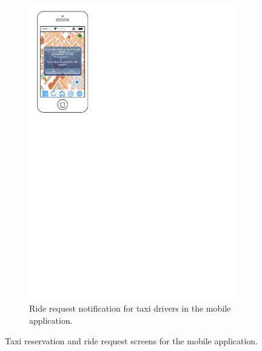 \begin{figure}[h]
\begin{subfigure}{0.45\textwidth}
        \includegraphics[width=\textwidth]{mockup/app/RideRequest}
        \caption{Ride request notification for taxi drivers in the mobile application.}
        \label{fig:mockup-riderequest-mobile}
    \end{subfigure}
    \caption{Taxi reservation and ride request screens for the mobile application.}
\end{figure}
